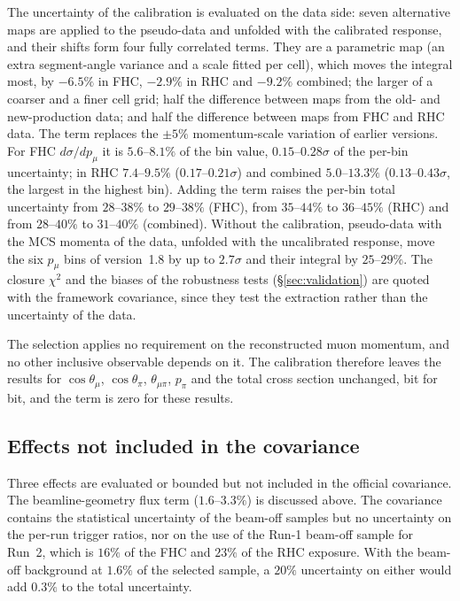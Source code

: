 \documentclass[11pt,a4paper]{article}
\begin{document}
The uncertainty of the calibration is evaluated on the data side: seven alternative maps are applied to the
pseudo-data and unfolded with the calibrated response, and their shifts form four fully correlated terms. They are
a parametric map (an extra segment-angle variance and a scale fitted per cell), which moves the integral most,
by $-6.5\%$ in FHC, $-2.9\%$ in RHC and $-9.2\%$ combined; the larger of a coarser and a finer cell grid; half the
difference between maps from the old- and new-production data; and half the difference between maps from FHC and
RHC data. The term replaces the $\pm5\%$ momentum-scale variation of earlier versions. For FHC
$d\sigma/dp_\mu$ it is $5.6$--$8.1\%$ of the bin value, $0.15$--$0.28\sigma$ of the per-bin uncertainty; in RHC
$7.4$--$9.5\%$ ($0.17$--$0.21\sigma$) and combined $5.0$--$13.3\%$ ($0.13$--$0.43\sigma$, the largest in the highest
bin). Adding the term raises the per-bin total uncertainty from $28$--$38\%$ to $29$--$38\%$ (FHC), from $35$--$44\%$
to $36$--$45\%$ (RHC) and from $28$--$40\%$ to $31$--$40\%$ (combined). Without the calibration, pseudo-data with the
MCS momenta of the data, unfolded with the uncalibrated response, move the six $p_\mu$ bins of version~1.8 by up to
$2.7\sigma$ and their integral by $25$--$29\%$. The closure $\chi^2$ and the biases of the robustness tests
(\S\ref{sec:validation}) are quoted with the framework covariance, since they test the extraction rather than the
uncertainty of the data.

The selection applies no requirement on the reconstructed muon momentum, and no other inclusive observable depends
on it. The calibration therefore leaves the results for $\cos\theta_\mu$, $\cos\theta_\pi$, $\theta_{\mu\pi}$,
$p_\pi$ and the total cross section unchanged, bit for bit, and the term is zero for these results.

\subsection{Effects not included in the covariance}
\label{sec:notincov}

Three effects are evaluated or bounded but not included in the official covariance.
The beamline-geometry flux term ($1.6$--$3.3\%$) is discussed above. The covariance contains the
statistical uncertainty of the beam-off samples but no uncertainty on the per-run trigger ratios, nor
on the use of the Run-1 beam-off sample for Run~2, which is $16\%$ of the FHC and $23\%$ of the RHC
exposure. With the beam-off background at $1.6\%$ of the selected sample, a $20\%$ uncertainty on
either would add $0.3\%$ to the total uncertainty.
\end{document}
